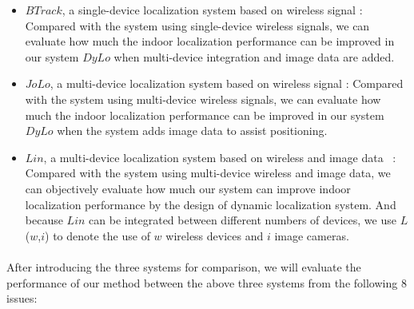\documentclass[a4paper,12pt]{report}
\begin{document}
\begin{itemize}
\item  $BTrack$, a single-device localization system based on wireless signal \cite{Sou2019BTrack} : Compared with the system using single-device wireless signals, we can evaluate how much the indoor localization performance can be improved in our system $DyLo$ when multi-device integration and image data are added.
\item  $JoLo$, a multi-device localization system based on wireless signal \cite{Sou2022JoLo} : Compared with the system using multi-device wireless signals, we can evaluate how much the indoor localization performance can be improved in our system $DyLo$ when the system adds image data to assist positioning.
\item  $Lin$, a multi-device localization system based on wireless and image data \cite{Lin2021}~: Compared with the system using multi-device wireless and image data, we can objectively evaluate how much our system can improve indoor localization performance by the design of dynamic localization system. And because $Lin$ can be integrated between different numbers of devices, we use $L$($w$,$i$) to denote the use of $w$ wireless devices and $i$ image cameras.
\end{itemize}
%

\paragraph{}
After introducing the three systems for comparison, we will evaluate the performance of our method between the above three systems from the following 8 issues:
\end{document}
